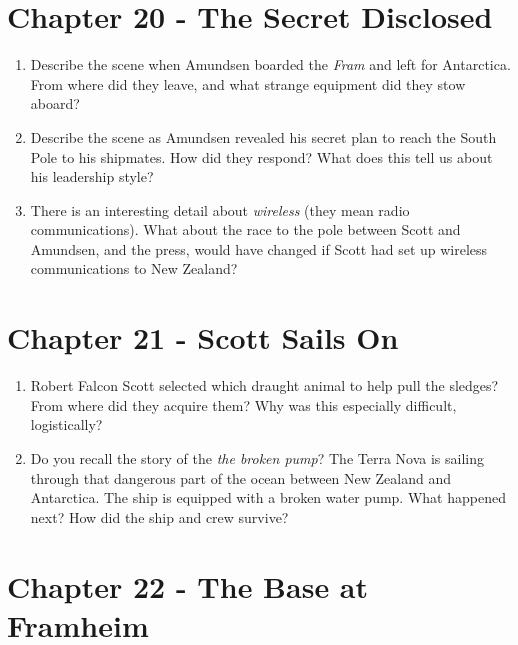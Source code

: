 \documentclass{article}
\begin{document}
\section{Chapter 20 - The Secret Disclosed}
\begin{enumerate}
\item Describe the scene when Amundsen boarded the \textit{Fram} and left for Antarctica.  From where did they leave, and what strange equipment did they stow aboard? \\ \vspace{2cm}
\item Describe the scene as Amundsen revealed his secret plan to reach the South Pole to his shipmates.  How did they respond?  What does this tell us about his leadership style?  \\ \vspace{2cm}
\item There is an interesting detail about \textit{wireless} (they mean radio communications).  What about the race to the pole between Scott and Amundsen, and the press, would have changed if Scott had set up wireless communications to New Zealand? \\ \vspace{2cm}
\end{enumerate}

\section{Chapter 21 - Scott Sails On}

\begin{enumerate}
\item Robert Falcon Scott selected which draught animal to help pull the sledges?  From where did they acquire them?  Why was this especially difficult, logistically? \\ \vspace{2cm}
\item Do you recall the story of the \textit{the broken pump}?  The Terra Nova is sailing through that dangerous part of the ocean between New Zealand and Antarctica.  The ship is equipped with a broken water pump.  What happened next?  How did the ship and crew survive? \\ \vspace{2cm}
\end{enumerate}

\section{Chapter 22 - The Base at Framheim}
\end{document}
